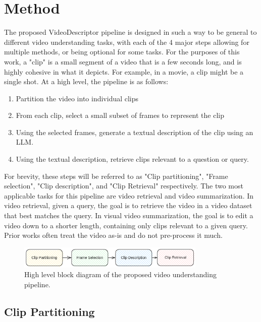 \section{Method}


The proposed VideoDescriptor pipeline is designed in such a way to be general to different video understanding tasks, with each of the 4 major steps allowing for multiple methods, or being optional for some tasks.
For the purposes of this work, a "clip" is a small segment of a video that is a few seconds long, 
and is highly cohesive in what it depicts. For example, in a movie, a clip might be a single shot.
At a high level, the pipeline is as follows:
\begin{enumerate}
      \item Partition the video into individual clips
      \item From each clip, select a small subset of frames to represent the clip
      \item Using the selected frames, generate a textual description of the clip using an LLM.
      \item Using the textual description, retrieve clips relevant to a question or query.
\end{enumerate}

For brevity, these steps will be referred to as "Clip partitioning", "Frame selection", "Clip description", and "Clip Retrieval" respectively.
The two most applicable tasks for this pipeline are video retrieval and video summarization.
In video retrieval, given a query, the goal is to retrieve the video in a video dataset that best matches the query.
In visual video summarization, the goal is to edit a video down to a shorter length, containing only clips relevant to a given query.
Prior works often treat the video as-is and do not pre-process it much.

\begin{figure}[h]
      \centering
      \includegraphics[width=0.8\textwidth]{figures/pipeline.png}
      \caption{High level block diagram of the proposed video understanding pipeline.}
      \label{fig:pipeline}
\end{figure}



\subsection{Clip Partitioning}

